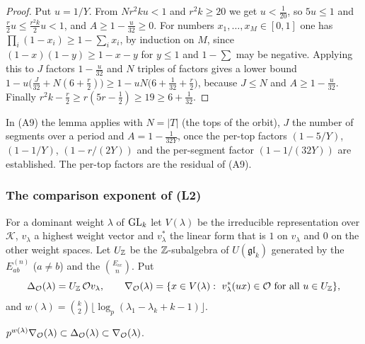 \begin{proof}
Put $u=1/Y$. From $Nr^2ku<1$ and $r^2k\ge20$ we get $u<\frac1{20}$, so $5u\le1$ and $\frac r2u\le\frac{r^2k}{2}u<1$, and $A\ge1-\frac u{32}\ge0$. For numbers $x_1,\dots,x_M\in[0,1]$ one has $\prod_i(1-x_i)\ge1-\sum_ix_i$, by induction on $M$, since $(1-x)(1-y)\ge1-x-y$ for $y\le1$ and $1-\sum$ may be negative. Applying this to $J$ factors $1-\frac u{32}$ and $N$ triples of factors gives a lower bound $1-u\big(\frac J{32}+N(6+\frac r2)\big)\ge1-uN\big(6+\frac1{32}+\frac r2\big)$, because $J\le N$ and $A\ge1-\frac u{32}$. Finally $r^2k-\frac r2\ge r(5r-\frac12)\ge19\ge6+\frac1{32}$.
\end{proof}

In (A9) the lemma applies with $N=\lvert T\rvert$ (the tops of the orbit), $J$ the number of segments over a period and $A=1-\frac1{32Y}$, once the per-top factors $(1-5/Y)$, $(1-1/Y)$, $(1-r/(2Y))$ and the per-segment factor $(1-1/(32Y))$ are established. The per-top factors are the residual of (A9).



\subsubsection{The comparison exponent of (L2)}\label{r2:sec:L2}

For a dominant weight $\lambda$ of $\operatorname{GL}_k$ let $V(\lambda)$ be the irreducible representation over $\mathcal K$, $v_\lambda$ a highest weight vector and $v_\lambda^*$ the linear form that is $1$ on $v_\lambda$ and $0$ on the other weight spaces. Let $U_\mathbb Z$ be the $\mathbb Z$-subalgebra of $U(\mathfrak{gl}_k)$ generated by the $E_{ab}^{(n)}$ ($a\ne b$) and the $\binom{E_{cc}}n$. Put
\[
\Delta_\cO(\lambda)=U_\bZ\,\cO v_\lambda,\qquad\nabla_\cO(\lambda)=\{x\in V(\lambda):\ v_\lambda^*(ux)\in\cO\ \text{for all }u\in U_\bZ\},
\]
and $w(\lambda)=\binom k2\lfloor\log_p(\lambda_1-\lambda_k+k-1)\rfloor$.

\begin{proposition}\label{r2:prop:nabladelta}
$p^{w(\lambda)}\nabla_\mathcal O(\lambda)\subset\Delta_\mathcal O(\lambda)\subset\nabla_\mathcal O(\lambda)$.
\end{proposition}

